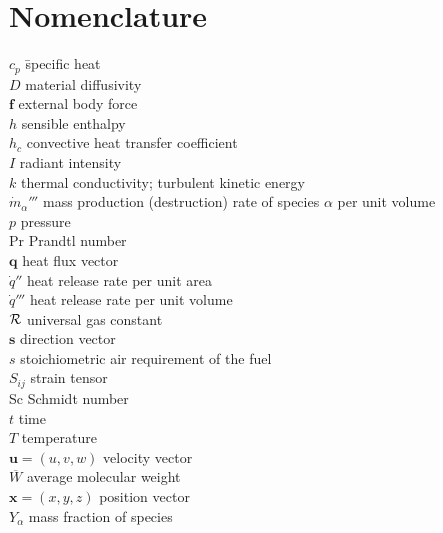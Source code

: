 \documentclass[graybox]{svmult}
\begin{document}
\section{Nomenclature}

\begin{tabbing}
$c_p$ 	\hspace{1in}     \= specific heat \\
$D$	                     \> material diffusivity \\
$\mathbf{f}$	         \> external body force \\
$h$                      \>	sensible enthalpy \\
$h_c$ 	                 \> convective heat transfer coefficient \\
$I$	                     \> radiant intensity \\
$k$	                     \> thermal	conductivity; turbulent	kinetic energy \\
$\dot{m}_\alpha'''$      \> mass production (destruction) rate of species $\alpha$ per unit volume \\
$p$	                     \> pressure \\
Pr	                     \> Prandtl number \\
$\mathbf{q}$	         \> heat flux vector \\
$\dot{q}''$              \> heat release rate per unit area \\
$\dot{q}'''$             \> heat release rate per unit volume \\
$\cal R$                 \> universal gas constant \\
$\mathbf{s}$	         \> direction vector \\
$s$	                     \> stoichiometric air requirement of the fuel \\
$S_{ij}$ 	             \> strain tensor \\
Sc	                     \> Schmidt number \\
$t$	                     \> time \\
$T$	                     \> temperature \\
$\mathbf{u}=(u,v,w)$     \> velocity vector \\
$\overline{W}$	         \> average molecular weight \\
$\mathbf{x}=(x,y,z)$	 \> position vector \\
$Y_\alpha$               \> mass fraction of species
\end{tabbing}
\end{document}
